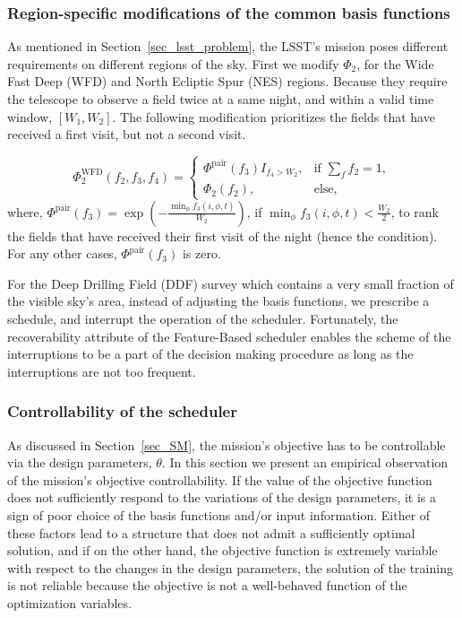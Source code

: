 \documentclass[12pt]{aastex62}
\theoremstyle{definition}
\begin{document}
\subsubsection{Region-specific modifications of the common basis functions}

As mentioned in Section~\ref{sec_lsst_problem}, the LSST's mission poses different requirements on different regions of the sky.  First we modify $\Phi_2$, for the Wide Fast Deep (WFD) and North Ecliptic Spur (NES) regions. Because they require the telescope to observe a field twice at a same night, and within a valid time window, $[W_1,W_2]$. The following modification prioritizes the fields that have received a first visit, but not a second visit.

\begin{equation*}
\Phi_2^{\text{WFD}}(f_2,f_3,f_4) =\begin{cases} \Phi^{\text{pair}}(f_3)I_{f_4> W_2},& \text{if } \sum\limits_{f}{f_2} = 1,\\ \Phi_2(f_2),& \text{else,} \end{cases}
\end{equation*}
where, $\Phi^{\text{pair}}(f_3) = \exp(- \frac{\min_{\phi}f_3(i,\phi,t)}{W_2})$, if $ \min_{\phi}f_3(i,\phi,t) < \frac{W_2}{2}$, to rank the fields that have received their first visit of the night (hence the condition). For any other cases, $\Phi^{\text{pair}}(f_3)$ is zero.

For the Deep Drilling Field (DDF) survey which contains a very small fraction of the visible sky's area, instead of adjusting the basis functions, we prescribe a schedule, and interrupt the operation of the scheduler. Fortunately, the recoverability attribute of the Feature-Based scheduler enables the scheme of the interruptions to be a part of the decision making procedure as long as the interruptions are not too frequent.

\subsubsection{Controllability of the scheduler}\label{sec_sim_cont}

As discussed in Section~\ref{sec_SM}, the mission's objective has to be controllable via the design parameters, $\theta$. In this section we present an empirical observation of the mission's objective controllability. If the value of the objective function does not sufficiently respond to the variations of the design parameters, it is a sign of poor choice of the basis functions and/or input information. Either of these factors lead to a structure that does not admit a sufficiently optimal solution, and if on the other hand, the objective function is extremely variable with respect to the changes in the design parameters, the solution of the training is not reliable because the objective is not a well-behaved function of the optimization variables.
\end{document}
